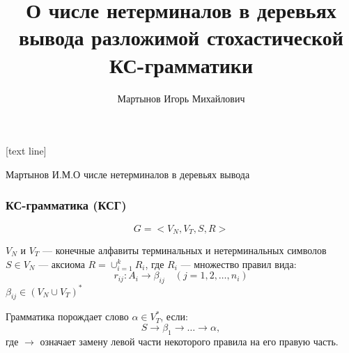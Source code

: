 \documentclass{beamer}
\title{О числе нетерминалов в деревьях вывода разложимой стохастической КС-грамматики}
\author{Мартынов Игорь Михайлович}
\begin{document}
	
	\titlepage
	
%		
%		
%	
%			
%			
	
	[text line]
	{
		\parbox{\linewidth}{\vspace*{-8pt} \color{gray} Мартынов И.М.\hfill О числе нетерминалов в деревьях вывода \hfill\insertpagenumber}
	}

	\begin{frame}
		\frametitle{КС-грамматика (КСГ)}
		$$
			G = <V_N, V_T, S, R>
		$$
		
		$V_N$ и $V_T$ --- конечные алфавиты терминальных и нетерминальных символов
		$S \in V_N$ --- аксиома
		$R = \cup_{i=1}^k R_i$, где $R_i$ --- множество правил вида:
		\begin{equation*}
		r_{ij} : A_i \rightarrow \beta_{ij}\quad (j = 1,2,\ldots,n_i)
		\end{equation*}
		$\beta_{ij} \in (V_N \cup V_T)^*$
		
		Грамматика порождает слово $\alpha \in V_T^*$, если:
		$$
			S \rightarrow \beta_1 \rightarrow \ldots \rightarrow \alpha,
		$$
		где $\rightarrow$ означает замену левой части некоторого правила на его правую часть.
	\end{frame}
\end{document}
